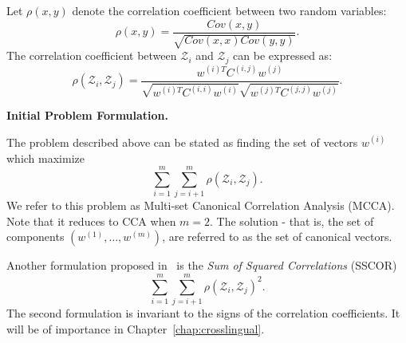 Let $\rho\left(x,y\right)$ denote the correlation
 coefficient between two random variables:
\begin{equation*}
\rho\left(x,y\right) =
 \frac{Cov\left(x,y\right)}{\sqrt{Cov\left(x,x\right) Cov\left(y,y\right)}}.
\end{equation*}
 The correlation coefficient between $\mathcal{Z}_i$ and
 $\mathcal{Z}_j$ can be expressed as:
\begin{equation*}
\rho\left(\mathcal{Z}_i, \mathcal{Z}_j\right) = \frac{w^{(i)T} C^{(i,j)}
   w^{(j)}}{\sqrt{w^{(i)T} C^{(i,i)} w^{(i)}}\sqrt{w^{(j)T}
     C^{(j,j)} w^{(j)}} }.
\end{equation*}

\noindent\textbf{Initial Problem Formulation.}

The problem described above can be stated as
finding the set of vectors $w^{(i)}$
which maximize
\begin{equation}\label{eq:SUMCOR}
\tag{SUMCOR}
\sum_{i = 1}^m \sum_{j = i+1}^m
\rho\left(\mathcal{Z}_i, \mathcal{Z}_j\right).
\end{equation}
We refer to this problem as Multi-set Canonical
Correlation Analysis (MCCA). Note that it reduces to CCA when
$m=2$. The solution - that is, the set of components $\left(w^{(1)}, \ldots, w^{(m)}\right)$,
are referred to as the set of canonical vectors.

Another formulation proposed in~\cite{Kettenring} is the \emph{Sum of Squared Correlations} (SSCOR)
\begin{equation}\label{eq:SSCOR}
\tag{SSCOR}
\sum_{i = 1}^m \sum_{j = i+1}^m
\rho\left(\mathcal{Z}_i, \mathcal{Z}_j\right)^2.
\end{equation}
The second formulation is invariant to the signs of the correlation coefficients. It will
be of importance in Chapter~\ref{chap:crosslingual}.

